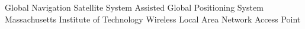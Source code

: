 \renewcommand*{\acsfont}[1]{\normalfont{\normalsize{#1}}}
\onecolumn
\begin{acronym}[ADC]
\setlength{\itemsep}{-\parsep}
	 {Global Navigation Satellite System}
	 {Assisted Global Positioning System}
	 {Massachusetts Institute of Technology}
	 {Wireless Local Area Network}
	 {Access Point}
\end{acronym}
\twocolumn
